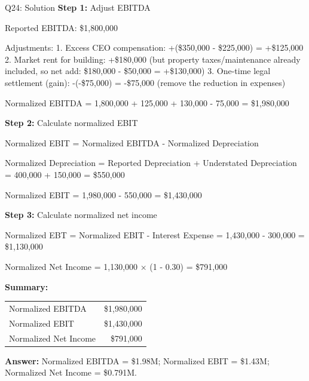 \documentclass{beamer}
\renewcommand{\scriptsize}{\fontsize{6pt}{7pt}\selectfont}
\begin{document}
	\begin{frame}{Q24: Solution}
		\scriptsize
		\textbf{Step 1:} Adjust EBITDA
		
		Reported EBITDA: \$1,800,000
		
		Adjustments:
		1. Excess CEO compensation: +(\$350,000 - \$225,000) = +\$125,000
		2. Market rent for building: +\$180,000 (but property taxes/maintenance already included, so net add: \$180,000 - \$50,000 = +\$130,000)
		3. One-time legal settlement (gain): -(-\$75,000) = -\$75,000 (remove the reduction in expenses)
		
		Normalized EBITDA = 1,800,000 + 125,000 + 130,000 - 75,000 = \$1,980,000
		
		\vspace{2pt}
		\textbf{Step 2:} Calculate normalized EBIT
		
		Normalized EBIT = Normalized EBITDA - Normalized Depreciation
		
		Normalized Depreciation = Reported Depreciation + Understated Depreciation
		= 400,000 + 150,000 = \$550,000
		
		Normalized EBIT = 1,980,000 - 550,000 = \$1,430,000
		
		\vspace{2pt}
		\textbf{Step 3:} Calculate normalized net income
		
		Normalized EBT = Normalized EBIT - Interest Expense = 1,430,000 - 300,000 = \$1,130,000
		
		Normalized Net Income = 1,130,000 × (1 - 0.30) = \$791,000
		
		\vspace{2pt}
		\textbf{Summary:}
		\begin{tabular}{lr}
			Normalized EBITDA & \$1,980,000 \\
			Normalized EBIT & \$1,430,000 \\
			Normalized Net Income & \$791,000 \\
		\end{tabular}
		
		\vspace{2pt}
		\textbf{Answer:} Normalized EBITDA = \$1.98M; Normalized EBIT = \$1.43M; Normalized Net Income = \$0.791M.
	\end{frame}
	
\end{document}
